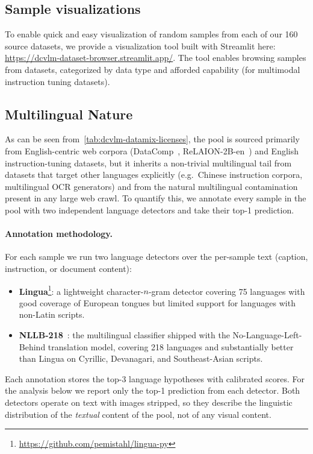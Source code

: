 

\subsection{Sample visualizations}
To enable quick and easy visualization of random samples from each of our 160 source datasets, we provide a visualization tool built with Streamlit here: \href{https://dcvlm-dataset-browser.streamlit.app/}{https://dcvlm-dataset-browser.streamlit.app/}.
The tool enables browsing samples from datasets, categorized by data type and afforded capability (for multimodal instruction tuning datasets).



\subsection{Multilingual Nature}\label{app:multilingual}

As can be seen from~\cref{tab:dcvlm-datamix-licenses}, the \dcvlm{} pool is sourced primarily from English-centric web corpora (DataComp~\citep{gadre2023datacomp}, ReLAION-2B-en~\citep{schuhmann2022laion}) and English instruction-tuning datasets, but it inherits a non-trivial multilingual tail from datasets that target other languages explicitly (e.g.\ Chinese instruction corpora, multilingual OCR generators) and from the natural multilingual contamination present in any large web crawl. To quantify this, we annotate every sample in the pool with two independent language detectors and take their top-1 prediction.

\paragraph{Annotation methodology.} For each sample we run two language detectors over the per-sample text (caption, instruction, or document content):
\begin{itemize}[leftmargin=15pt,topsep=2pt,itemsep=2pt]
  \item \textbf{Lingua}\footnote{\url{https://github.com/pemistahl/lingua-py}}: a lightweight character-$n$-gram detector covering 75 languages with good coverage of European tongues but limited support for languages with non-Latin scripts.
  \item \textbf{NLLB-218}~\citep{costa2022no}: the multilingual classifier shipped with the No-Language-Left-Behind translation model, covering 218 languages and substantially better than Lingua on Cyrillic, Devanagari, and Southeast-Asian scripts.
\end{itemize}
Each annotation stores the top-3 language hypotheses with calibrated scores. For the analysis below we report only the top-1 prediction from each detector. Both detectors operate on text with images stripped, so they describe the linguistic distribution of the \emph{textual} content of the pool, not of any visual content.

